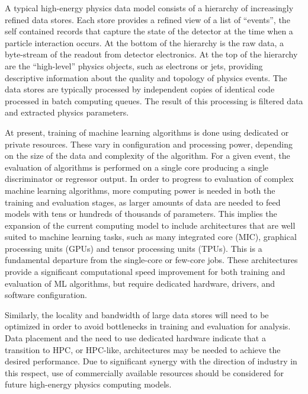 \vspace{10pt} %
A typical high-energy physics data model consists of a hierarchy of increasingly refined data stores. Each store provides a refined view of a list of ``events'', the self contained records that capture the state of the detector at the time when a particle interaction occurs. At the bottom of the hierarchy is the raw data, a byte-stream of the readout from detector electronics. At the top of the hierarchy are the ``high-level'' physics objects, such as electrons or jets, providing descriptive information about the quality and topology of physics events. The data stores are typically processed by independent copies of identical code processed in batch computing queues. The result of this processing is filtered data and extracted physics parameters.%

At present, training of machine learning algorithms is done using dedicated or private resources. These vary in configuration and processing power, depending on the size of the data and complexity of the algorithm. For a given event, the evaluation of algorithms is performed on a single core producing a single discriminator or regressor output. In order to progress to evaluation of complex machine learning algorithms, more computing power is needed in both the training and evaluation stages, as larger amounts of data are needed to feed models with tens or hundreds of thousands of parameters. This implies the expansion of the current computing model to include architectures that are well suited to machine learning tasks, such as many integrated core (MIC), graphical processing units (GPUs) and tensor processing units (TPUs). This is a fundamental departure from the single-core or few-core jobs. These architectures provide a significant computational speed improvement for both training and evaluation of ML algorithms, but require dedicated hardware, drivers, and software configuration.

Similarly, the locality and bandwidth of large data stores will need to be optimized in order to avoid bottlenecks in training and evaluation for analysis. Data placement and the need to use dedicated hardware indicate that a transition to HPC, or HPC-like, architectures may be needed to achieve the desired performance. Due to significant synergy with the direction of industry in this respect, use of commercially available resources should be considered for future high-energy physics computing models.

